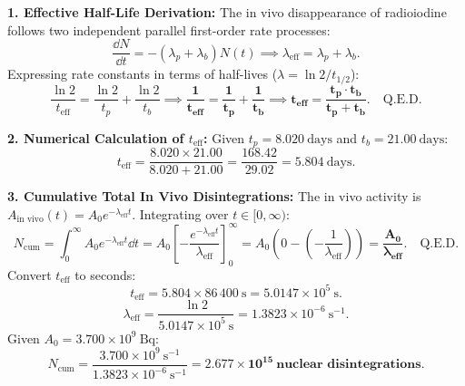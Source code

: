 \begin{solution}
\textbf{1. Effective Half-Life Derivation:}
The in vivo disappearance of radioiodine follows two independent parallel first-order rate processes:
\[
\frac{\dd N}{\dd t} = -(\lambda_p + \lambda_b) N(t) \implies \lambda_{\text{eff}} = \lambda_p + \lambda_b.
\]
Expressing rate constants in terms of half-lives ($\lambda = \ln 2 / t_{1/2}$):
\[
\frac{\ln 2}{t_{\text{eff}}} = \frac{\ln 2}{t_p} + \frac{\ln 2}{t_b} \implies \mathbf{\frac{1}{t_{\text{eff}}} = \frac{1}{t_p} + \frac{1}{t_b}} \implies \mathbf{t_{\text{eff}} = \frac{t_p \cdot t_b}{t_p + t_b}}. \quad \text{Q.E.D.}
\]

\textbf{2. Numerical Calculation of $t_{\text{eff}}$:}
Given $t_p = 8.020\ \mathrm{days}$ and $t_b = 21.00\ \mathrm{days}$:
\[
t_{\text{eff}} = \frac{8.020 \times 21.00}{8.020 + 21.00} = \frac{168.42}{29.02} = \mathbf{5.804\ \mathrm{days}}.
\]

\textbf{3. Cumulative Total In Vivo Disintegrations:}
The in vivo activity is $A_{\text{in vivo}}(t) = A_0 e^{-\lambda_{\text{eff}} t}$.
Integrating over $t \in [0, \infty)$:
\[
N_{\text{cum}} = \int_0^\infty A_0 e^{-\lambda_{\text{eff}} t} \dd t = A_0 \left[ -\frac{e^{-\lambda_{\text{eff}} t}}{\lambda_{\text{eff}}} \right]_0^\infty = A_0 \left( 0 - \left( -\frac{1}{\lambda_{\text{eff}}} \right) \right) = \mathbf{\frac{A_0}{\lambda_{\text{eff}}}}. \quad \text{Q.E.D.}
\]
Convert $t_{\text{eff}}$ to seconds:
\[
t_{\text{eff}} = 5.804 \times 86\,400\ \mathrm{s} = 5.0147 \times 10^5\ \mathrm{s}.
\]
\[
\lambda_{\text{eff}} = \frac{\ln 2}{5.0147 \times 10^5\ \mathrm{s}} = 1.3823 \times 10^{-6}\ \mathrm{s^{-1}}.
\]
Given $A_0 = 3.700 \times 10^9\ \mathrm{Bq}$:
\[
N_{\text{cum}} = \frac{3.700 \times 10^9\ \mathrm{s^{-1}}}{1.3823 \times 10^{-6}\ \mathrm{s^{-1}}} = \mathbf{2.677 \times 10^{15}\ \text{nuclear disintegrations}}.
\]
\end{solution}

